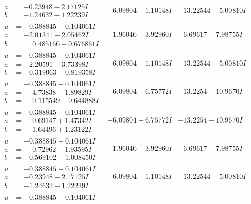\documentclass[1p]{elsarticle_modified}
\theoremstyle{definition}
\begin{document}
$$\begin{array}{c|c|c}
\begin{aligned}
a &= -0.23948 - 2.17125 I \\
b &= -1.24632 - 1.22239 I\end{aligned}
 & -6.09804 + 1.10148 I & -13.22544 - 5.00810 I \\ \hline\begin{aligned}
u &= -0.388845 + 0.104061 I \\
a &= -2.01341 + 2.05462 I \\
b &= \phantom{-}0.485166 + 0.676861 I\end{aligned}
 & -1.96046 + 3.92960 I & -6.69617 - 7.98755 I \\ \hline\begin{aligned}
u &= -0.388845 + 0.104061 I \\
a &= -2.20591 - 3.73398 I \\
b &= -0.319063 - 0.819358 I\end{aligned}
 & -6.09804 + 1.10148 I & -13.22544 - 5.00810 I \\ \hline\begin{aligned}
u &= -0.388845 + 0.104061 I \\
a &= \phantom{-}4.73838 - 1.89829 I \\
b &= \phantom{-}0.115549 - 0.644888 I\end{aligned}
 & -6.09804 + 6.75772 I & -13.2254 - 10.9670 I \\ \hline\begin{aligned}
u &= -0.388845 - 0.104061 I \\
a &= \phantom{-}0.69147 + 1.47342 I \\
b &= \phantom{-}1.64496 + 1.23122 I\end{aligned}
 & -6.09804 - 6.75772 I & -13.2254 + 10.9670 I \\ \hline\begin{aligned}
u &= -0.388845 - 0.104061 I \\
a &= \phantom{-}0.72962 - 1.93595 I \\
b &= -0.569102 - 1.008450 I\end{aligned}
 & -1.96046 - 3.92960 I & -6.69617 + 7.98755 I \\ \hline\begin{aligned}
u &= -0.388845 - 0.104061 I \\
a &= -0.23948 + 2.17125 I \\
b &= -1.24632 + 1.22239 I\end{aligned}
 & -6.09804 - 1.10148 I & -13.22544 + 5.00810 I \\ \hline\begin{aligned}
u &= -0.388845 - 0.104061 I \\

\end{aligned}
\end{array}$$
\end{document}
